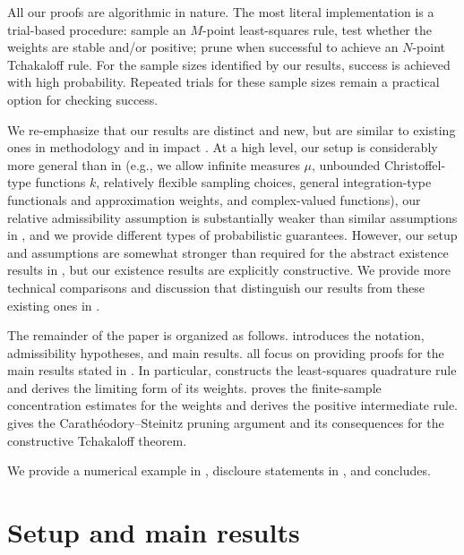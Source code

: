 \documentclass[10pt,dvipsnames]{amsart}
\begin{document}
All our proofs are algorithmic in nature. The most literal implementation is a
trial-based procedure: sample an \(M\)-point least-squares rule, test whether
the weights are stable and/or positive; prune when successful to achieve an
$N$-point Tchakaloff rule. For the sample sizes identified by our results,
success is achieved with high probability. Repeated trials for these sample
sizes remain a practical option for checking success.

We re-emphasize that our results are distinct and new, but are similar to
existing ones in methodology \cite{migliorati2022stable} and in impact
\cite{schafer_2025}. At a high level, our setup is considerably more general
than in \cite{migliorati2022stable} (e.g., we allow infinite measures $\mu$,
unbounded Christoffel-type functions $k$, relatively flexible sampling choices,
general integration-type functionals and approximation weights, and
complex-valued functions), our relative admissibility assumption is
substantially weaker than similar assumptions in \cite[Theorem
6]{migliorati2022stable}, and we provide different types of probabilistic
guarantees. However, our setup and assumptions are somewhat stronger than
required for the abstract existence results in \cite{schafer_2025}, but our
existence results are explicitly constructive.  We provide more technical
comparisons and discussion that distinguish our results from these existing
ones in .

The remainder of the paper is organized as follows.
 introduces the notation, admissibility
hypotheses, and main results.   all focus on providing proofs for the main results stated in . In particular,  constructs the
least-squares quadrature rule and derives the limiting form of its weights.
 proves the finite-sample concentration estimates for
the weights and derives the positive intermediate rule.
 gives the Carath\'eodory--Steinitz pruning
argument and its consequences for the constructive Tchakaloff theorem.

We provide a numerical example in ,
discloure statements in ,
and  concludes.


\section{Setup and main results}
\end{document}
